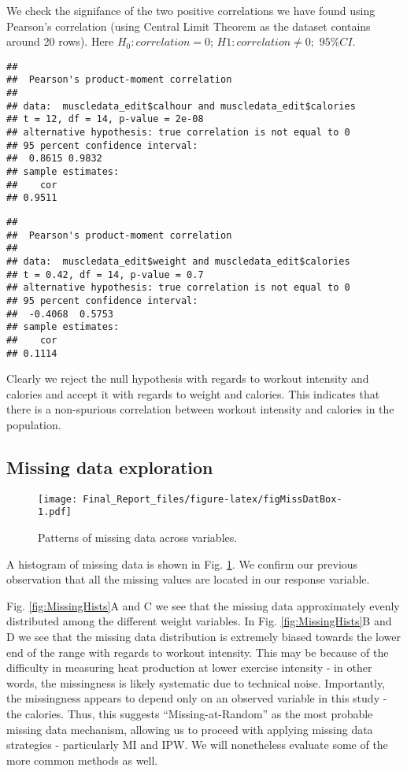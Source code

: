\documentclass[]{article}
\theoremstyle{definition}
\theoremstyle{definition}
\theoremstyle{definition}
\theoremstyle{remark}
\begin{document}
We check the signifance of the two positive correlations we have found
using Pearson's correlation (using Central Limit Theorem as the dataset
contains around 20 rows). Here \(H_0:correlation=0\);
\(H1:correlation \neq 0;\) \(95\%CI\).

\begin{verbatim}
## 
##  Pearson's product-moment correlation
## 
## data:  muscledata_edit$calhour and muscledata_edit$calories
## t = 12, df = 14, p-value = 2e-08
## alternative hypothesis: true correlation is not equal to 0
## 95 percent confidence interval:
##  0.8615 0.9832
## sample estimates:
##    cor 
## 0.9511
\end{verbatim}

\begin{verbatim}
## 
##  Pearson's product-moment correlation
## 
## data:  muscledata_edit$weight and muscledata_edit$calories
## t = 0.42, df = 14, p-value = 0.7
## alternative hypothesis: true correlation is not equal to 0
## 95 percent confidence interval:
##  -0.4068  0.5753
## sample estimates:
##    cor 
## 0.1114
\end{verbatim}

Clearly we reject the null hypothesis with regards to workout intensity
and calories and accept it with regards to weight and calories. This
indicates that there is a non-spurious correlation between workout
intensity and calories in the population.

\subsection{Missing data exploration}\label{missing-data-exploration}

\begin{figure}[htbp]
\centering
\texttt{[image: Final\_Report\_files/figure-latex/figMissDatBox-1.pdf]}
\caption{\label{fig:figMissDatBox}\label{fig:MissDatBox}Patterns of missing
data across variables.}
\end{figure}

A histogram of missing data is shown in Fig. \ref{fig:MissDatBox}. We
confirm our previous observation that all the missing values are located
in our response variable.

Fig. \ref{fig:MissingHists}A and C we see that the missing data
approximately evenly distributed among the different weight variables.
In Fig. \ref{fig:MissingHists}B and D we see that the missing data
distribution is extremely biased towards the lower end of the range with
regards to workout intensity. This may be because of the difficulty in
measuring heat production at lower exercise intensity - in other words,
the missingness is likely systematic due to technical noise.
Importantly, the missingness appears to depend only on an observed
variable in this study - the calories. Thus, this suggests
``Missing-at-Random'' as the most probable missing data mechanism,
allowing us to proceed with applying missing data strategies -
particularly MI and IPW. We will nonetheless evaluate some of the more
common methods as well.
\end{document}
